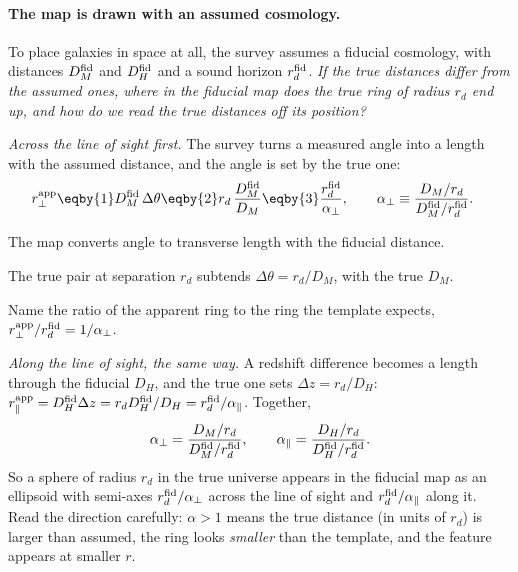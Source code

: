 \paragraph{The map is drawn with an assumed cosmology.} To place galaxies in space at all, the survey assumes a fiducial cosmology, with distances $D_M^{\rm fid}$ and $D_H^{\rm fid}$ and a sound horizon $r_d^{\rm fid}$. \emph{If the true distances differ from the assumed ones, where in the fiducial map does the true ring of radius $r_d$ end up, and how do we read the true distances off its position?}

\emph{Across the line of sight first.} The survey turns a measured angle into a length with the assumed distance, and the angle is set by the true one:
\begin{align}
  r_\perp^{\rm app}
  &\eqby{1}D_M^{\rm fid}\,\Delta\theta
  \eqby{2}r_d\,\frac{D_M^{\rm fid}}{D_M}
  \eqby{3}\frac{r_d^{\rm fid}}{\alpha_\perp},
  \qquad
  \alpha_\perp\equiv\frac{D_M/r_d}{D_M^{\rm fid}/r_d^{\rm fid}} .
  \label{T2b:eq:rperp-app}
\end{align}
\begin{explain}
  \item The map converts angle to transverse length with the fiducial distance.
  \item The true pair at separation $r_d$ subtends $\Delta\theta=r_d/D_M$, with the true $D_M$.
  \item Name the ratio of the apparent ring to the ring the template expects, $r_\perp^{\rm app}/r_d^{\rm fid}=1/\alpha_\perp$.
\end{explain}
\emph{Along the line of sight, the same way.} A redshift difference becomes a length through the fiducial $D_H$, and the true one sets $\Delta z=r_d/D_H$: $r_\parallel^{\rm app}=D_H^{\rm fid}\Delta z=r_dD_H^{\rm fid}/D_H=r_d^{\rm fid}/\alpha_\parallel$. Together,
\begin{equation}
  \alpha_\perp=\frac{D_M/r_d}{D_M^{\rm fid}/r_d^{\rm fid}},\qquad
  \alpha_\parallel=\frac{D_H/r_d}{D_H^{\rm fid}/r_d^{\rm fid}} .
  \label{T2b:eq:alphas}
\end{equation}
So a sphere of radius $r_d$ in the true universe appears in the fiducial map as an ellipsoid with semi-axes $r_d^{\rm fid}/\alpha_\perp$ across the line of sight and $r_d^{\rm fid}/\alpha_\parallel$ along it. Read the direction carefully: $\alpha>1$ means the true distance (in units of $r_d$) is larger than assumed, the ring looks \emph{smaller} than the template, and the feature appears at smaller $r$.

